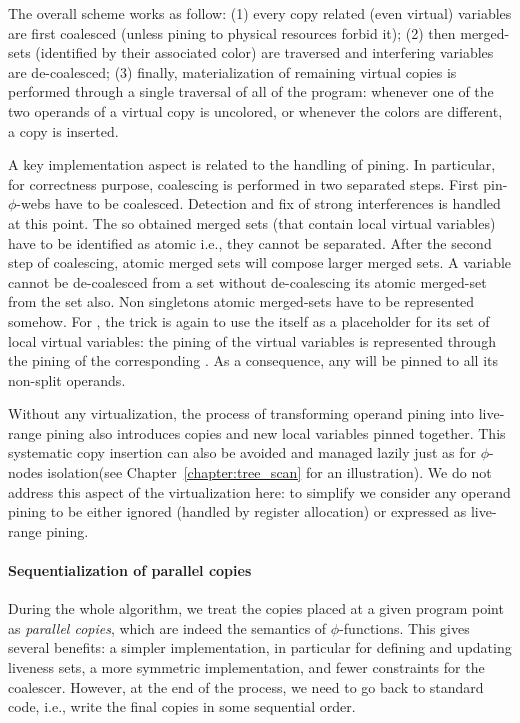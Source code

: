         
The overall scheme works as follow: (1) every copy related (even virtual) variables are first coalesced (unless pining to physical resources forbid it); (2) then merged-sets (identified by their associated color) are traversed and interfering variables are de-coalesced; (3) finally, materialization of remaining virtual copies is performed through a single traversal of all \phifuns of the program: whenever one of the two operands of a virtual copy is uncolored, or whenever the colors are different, a copy is inserted. 

A key implementation aspect is related to the handling of pining. In particular, for correctness purpose, coalescing is performed in two separated steps. First pin-$\phi$-webs have to be coalesced. Detection and fix of strong interferences is handled at this point. The so obtained merged sets (that contain local virtual variables) have to be identified as atomic i.e., they cannot be separated. After the second step of coalescing, atomic merged sets will compose larger merged sets. A variable cannot be de-coalesced from a set without de-coalescing its atomic merged-set from the set also. Non singletons atomic merged-sets have to be represented somehow. For \phifuns, the trick is again to use the \phifun itself as a placeholder for its set of local virtual variables: the pining of the virtual variables is represented through the pining of the corresponding \phifun. As a consequence, any \phifun will be pinned to all its non-split operands. 

Without any virtualization, the process of transforming operand pining into live-range pining also introduces copies and new local variables pinned together. This systematic copy insertion can also be avoided and managed lazily just as for $\phi$-nodes isolation\ifhab (see Chapter~\ref{chapter:tree_scan} for an illustration)\fi. We do not address this aspect of the virtualization here: to simplify we consider any operand pining to be either ignored (handled by register allocation) or expressed as live-range pining.





\paragraph{Sequentialization of parallel copies}

                    
During the whole algorithm, we treat the copies placed at a given program point
as \emph{parallel copies}, which are indeed the semantics of $\phi$-functions.
This gives several benefits: a simpler implementation, in particular for
defining and updating liveness sets, a more symmetric implementation,
and fewer constraints for the coalescer. However, at the end of the process, we
need to go back to standard code, i.e., write the final copies in some
sequential order.

